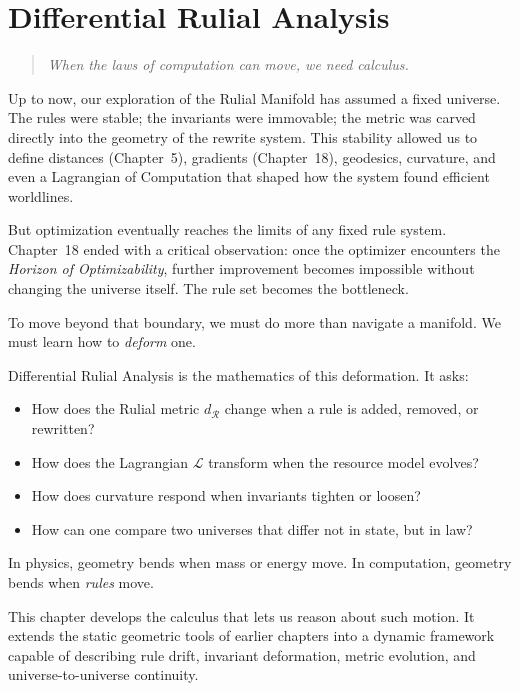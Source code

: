 \chapter{Differential Rulial Analysis}
\label{chapter-21-differential-rulial-analysis}

\begin{quote}
\emph{When the laws of computation can move, we need calculus.}
\end{quote}

Up to now, our exploration of the Rulial Manifold has assumed a fixed universe.
The rules were stable; the invariants were immovable; the metric was carved 
directly into the geometry of the rewrite system. This stability allowed us to
define distances (Chapter~5), gradients (Chapter~18), geodesics, curvature, 
and even a Lagrangian of Computation that shaped how the system found 
efficient worldlines.

But optimization eventually reaches the limits of any fixed rule system.
Chapter~18 ended with a critical observation: once the optimizer encounters 
the \emph{Horizon of Optimizability}, further improvement becomes impossible 
without changing the universe itself. The rule set becomes the bottleneck.

To move beyond that boundary, we must do more than navigate a manifold.
We must learn how to \emph{deform} one.

Differential Rulial Analysis is the mathematics of this deformation. It asks:

\begin{itemize}
    \item How does the Rulial metric $d_{\mathcal{R}}$ change when a rule is added, removed, or rewritten?
    \item How does the Lagrangian $\mathcal{L}$ transform when the resource model evolves?
    \item How does curvature respond when invariants tighten or loosen?
    \item How can one compare two universes that differ not in state, but in law?
\end{itemize}

In physics, geometry bends when mass or energy move.  
In computation, geometry bends when \emph{rules} move.

This chapter develops the calculus that lets us reason about such motion. 
It extends the static geometric tools of earlier chapters into a dynamic 
framework capable of describing 
rule drift, invariant deformation, metric evolution, and universe-to-universe continuity.

